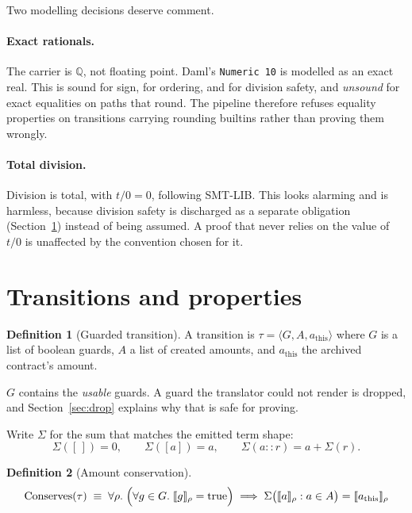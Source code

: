 \documentclass[11pt,a4paper]{article}
\newcommand{\seme}[2]{\llbracket #1 \rrbracket_{#2}}
\newcommand{\Rat}{\mathbb{Q}}
\newcommand{\Conserves}{\mathrm{Conserves}}
\newcommand{\code}[1]{\texttt{#1}}
\theoremstyle{definition}
\newtheorem{definition}{Definition}[section]
\theoremstyle{plain}
\theoremstyle{remark}
\begin{document}
Two modelling decisions deserve comment.

\paragraph{Exact rationals.} The carrier is $\Rat$, not floating point. Daml's
\code{Numeric 10} is modelled as an exact real. This is sound for sign, for
ordering, and for division safety, and \emph{unsound} for exact equalities on
paths that round. The pipeline therefore refuses equality properties on
transitions carrying rounding builtins rather than proving them wrongly.

\paragraph{Total division.} Division is total, with $t/0 = 0$, following
SMT-LIB. This looks alarming and is harmless, because division safety is
discharged as a separate obligation (Section~\ref{sec:props}) instead of being
assumed. A proof that never relies on the value of $t/0$ is unaffected by the
convention chosen for it.

\section{Transitions and properties}
\label{sec:props}

\begin{definition}[Guarded transition]
A transition is $\tau = \langle G, A, a_{\text{this}} \rangle$ where $G$ is a
list of boolean guards, $A$ a list of created amounts, and $a_{\text{this}}$
the archived contract's amount.
\end{definition}

$G$ contains the \emph{usable} guards. A guard the translator could not render
is dropped, and Section~\ref{sec:drop} explains why that is safe for proving.

Write $\Sigma$ for the sum that matches the emitted term shape:
\[
  \Sigma([\,]) = 0, \qquad \Sigma([a]) = a, \qquad \Sigma(a :: r) = a + \Sigma(r).
\]

\begin{definition}[Amount conservation]
\[
  \Conserves(\tau) \;\equiv\;
  \forall \rho.\;
  \Bigl( \forall g \in G.\; \seme{g}{\rho} = \text{true} \Bigr)
  \;\Longrightarrow\;
  \Sigma\bigl( \seme{a}{\rho} : a \in A \bigr) = \seme{a_{\text{this}}}{\rho}
\]
\end{definition}
\end{document}
